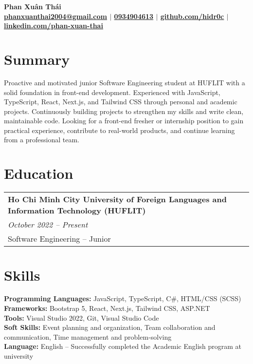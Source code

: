 \documentclass[a4paper,11pt]{article}
\begin{document}
\pagestyle{empty}

\begin{center}
\LARGE\textbf{Phan Xuân Thái} \\[5pt]
\small\textbf{\href{mailto:phanxuanthai2004@gmail.com}{phanxuanthai2004@gmail.com} $|$ 
\href{tel:0934904613}{0934904613} $|$ 
\href{https://github.com/hidr0c}{\textbf{\underline{github.com/hidr0c}}} $|$ 
\href{https://www.linkedin.com/in/xuân-thái-phan-bab693352/}{\textbf{\underline{linkedin.com/phan-xuan-thai}}} 
} \\[2pt]
\end{center}

\section{Summary}
Proactive and motivated junior Software Engineering student at HUFLIT with a solid foundation in front-end development. Experienced with JavaScript, TypeScript, React, Next.js, and Tailwind CSS through personal and academic projects. Continuously building projects to strengthen my skills and write clean, maintainable code. Looking for a front-end fresher or internship position to gain practical experience, contribute to real-world products, and continue learning from a professional team.

\section{Education}
\begin{tabularx}{\linewidth}{@{}l@{}}
\textbf{Ho Chi Minh City University of Foreign Languages and Information Technology (HUFLIT)} \\
\small\textit{October 2022 -- Present} \\
Software Engineering -- Junior
\end{tabularx}

\section{Skills}
\textbf{Programming Languages:} JavaScript, TypeScript, C\#, HTML/CSS (SCSS) \\
\textbf{Frameworks:} Bootstrap 5, React, Next.js, Tailwind CSS, ASP.NET \\
\textbf{Tools:} Visual Studio 2022, Git, Visual Studio Code \\
\textbf{Soft Skills:} Event planning and organization, Team collaboration and communication, Time management and problem-solving \\
\textbf{Language:} English – Successfully completed the Academic English program at university
\end{document}
